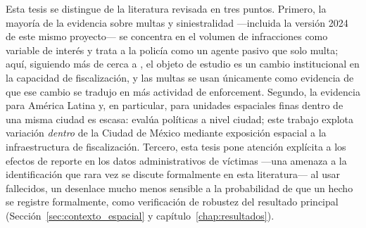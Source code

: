 Esta tesis se distingue de la literatura revisada en tres puntos. Primero, la
mayoría de la evidencia sobre multas y siniestralidad —incluida la versión
2024 de este mismo proyecto— se concentra en el volumen de infracciones como
variable de interés y trata a la policía como un agente pasivo que solo
multa; aquí, siguiendo más de cerca a \citet{deangelohansen2014}, el objeto de
estudio es un cambio institucional en la capacidad de fiscalización, y las
multas se usan únicamente como evidencia de que ese cambio se tradujo en más
actividad de enforcement. Segundo, la evidencia para América Latina y, en
particular, para unidades espaciales finas dentro de una misma ciudad es
escasa: \citet{quintero2023} evalúa políticas a nivel ciudad; este trabajo
explota variación \emph{dentro} de la Ciudad de México mediante exposición
espacial a la infraestructura de fiscalización. Tercero, esta tesis pone
atención explícita a los efectos de reporte en los datos administrativos de
víctimas —una amenaza a la identificación que rara vez se discute
formalmente en esta literatura— al usar fallecidos, un desenlace mucho menos
sensible a la probabilidad de que un hecho se registre formalmente, como
verificación de robustez del resultado principal
(Sección~\ref{sec:contexto_espacial} y capítulo~\ref{chap:resultados}).
